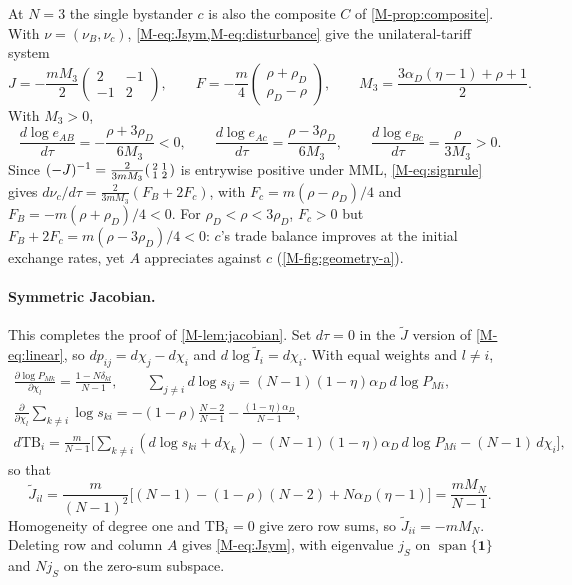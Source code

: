 \documentclass[11pt]{article}
\numberwithin{equation}{section}
\theoremstyle{plain}
\newcommand{\bone}{\mathbf{1}}
\newcommand{\TB}{\mathrm{TB}}
\begin{document}
At $N=3$ the single bystander $c$ is also the composite $C$ of \cref{M-prop:composite}. With $\nu=(\nu_B,\nu_c)$, \cref{M-eq:Jsym,M-eq:disturbance} give the unilateral-tariff system
\begin{equation}
J=-\frac{mM_3}{2}\begin{pmatrix}2&-1\\-1&2\end{pmatrix},\qquad
F=-\frac{m}{4}\begin{pmatrix}\rho+\rho_D\\\rho_D-\rho\end{pmatrix},\qquad
M_3=\frac{3\alpha_D(\eta-1)+\rho+1}{2}.
\label{eq:threecountry}
\end{equation}
With $M_3>0$,
\begin{equation}
\frac{d\log e_{AB}}{d\tau}=-\frac{\rho+3\rho_D}{6M_3}<0,\qquad
\frac{d\log e_{Ac}}{d\tau}=\frac{\rho-3\rho_D}{6M_3},\qquad
\frac{d\log e_{Bc}}{d\tau}=\frac{\rho}{3M_3}>0.
\end{equation}
Since $(-J)^{-1}=\frac{2}{3mM_3}\begin{psmallmatrix}2&1\\1&2\end{psmallmatrix}$ is entrywise positive under MML, \cref{M-eq:signrule} gives $d\nu_c/d\tau=\frac{2}{3mM_3}(F_B+2F_c)$, with $F_c=m(\rho-\rho_D)/4$ and $F_B=-m(\rho+\rho_D)/4<0$. For $\rho_D<\rho<3\rho_D$, $F_c>0$ but $F_B+2F_c=m(\rho-3\rho_D)/4<0$: $c$'s trade balance improves at the initial exchange rates, yet $A$ appreciates against $c$ (\cref{M-fig:geometry-a}).

\paragraph{Symmetric Jacobian.} This completes the proof of \cref{M-lem:jacobian}. Set $d\tau=0$ in the $\widetilde J$ version of \cref{M-eq:linear}, so $dp_{ij}=d\chi_j-d\chi_i$ and $d\log\tilde I_i=d\chi_i$. With equal weights and $l\neq i$,
\begin{gather*}
\frac{\partial\log P_{Mk}}{\partial\chi_l}=\frac{1-N\delta_{kl}}{N-1},\qquad
\sum_{j\neq i}d\log s_{ij}=(N-1)(1-\eta)\alpha_D\,d\log P_{Mi},\\
\frac{\partial}{\partial\chi_l}\sum_{k\neq i}\log s_{ki}=-(1-\rho)\frac{N-2}{N-1}-\frac{(1-\eta)\alpha_D}{N-1},\\
d\TB_i=\frac{m}{N-1}\Big[\sum_{k\neq i}(d\log s_{ki}+d\chi_k)-(N-1)(1-\eta)\alpha_D\,d\log P_{Mi}-(N-1)\,d\chi_i\Big],
\end{gather*}
so that
\begin{equation*}
\widetilde J_{il}=\frac{m}{(N-1)^2}\Big[(N-1)-(1-\rho)(N-2)+N\alpha_D(\eta-1)\Big]=\frac{mM_N}{N-1}.
\end{equation*}
Homogeneity of degree one and $\TB_i=0$ give zero row sums, so $\widetilde J_{ii}=-mM_N$. Deleting row and column $A$ gives \cref{M-eq:Jsym}, with eigenvalue $j_S$ on $\operatorname{span}\{\bone\}$ and $Nj_S$ on the zero-sum subspace.
\end{document}
